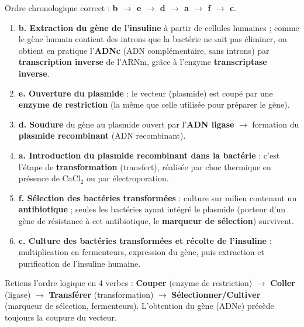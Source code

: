 \documentclass[11pt]{article}
\begin{document}
\begin{corrige}
Ordre chronologique correct : \textbf{b $\rightarrow$ e $\rightarrow$ d $\rightarrow$ a $\rightarrow$ f $\rightarrow$ c}.
\begin{enumerate}
\item \textbf{b. Extraction du gène de l'insuline} à partir de cellules humaines ; comme le gène humain contient des introns que la bactérie ne sait pas éliminer, on obtient en pratique l'\textbf{ADNc} (ADN complémentaire, sans introns) par \textbf{transcription inverse} de l'ARNm, grâce à l'enzyme \textbf{transcriptase inverse}.
\item \textbf{e. Ouverture du plasmide} : le vecteur (plasmide) est coupé par une \textbf{enzyme de restriction} (la même que celle utilisée pour préparer le gène).
\item \textbf{d. Soudure} du gène au plasmide ouvert par l'\textbf{ADN ligase} $\rightarrow$ formation du \textbf{plasmide recombinant} (ADN recombinant).
\item \textbf{a. Introduction du plasmide recombinant dans la bactérie} : c'est l'étape de \textbf{transformation} (transfert), réalisée par choc thermique en présence de CaCl$_2$ ou par électroporation.
\item \textbf{f. Sélection des bactéries transformées} : culture sur milieu contenant un \textbf{antibiotique} ; seules les bactéries ayant intégré le plasmide (porteur d'un gène de résistance à cet antibiotique, le \textbf{marqueur de sélection}) survivent.
\item \textbf{c. Culture des bactéries transformées et récolte de l'insuline} : multiplication en fermenteurs, expression du gène, puis extraction et purification de l'insuline humaine.
\end{enumerate}
\begin{methode}
Retiens l'ordre logique en 4 verbes : \textbf{Couper} (enzyme de restriction) $\rightarrow$ \textbf{Coller} (ligase) $\rightarrow$ \textbf{Transférer} (transformation) $\rightarrow$ \textbf{Sélectionner/Cultiver} (marqueur de sélection, fermenteurs). L'obtention du gène (ADNc) précède toujours la coupure du vecteur.
\end{methode}
\end{corrige}
\end{document}
